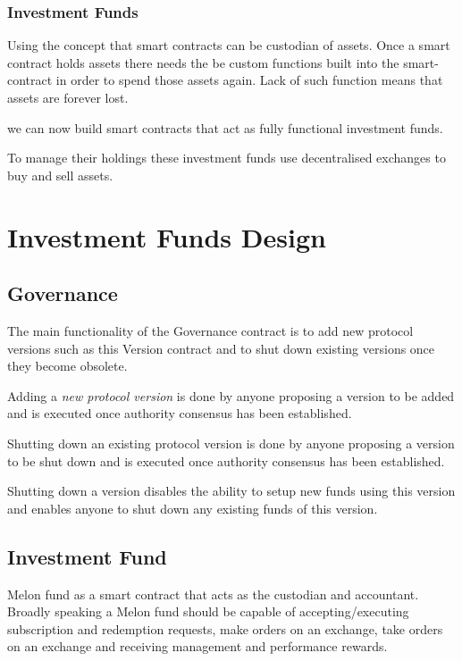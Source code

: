 \documentclass[conference]{IEEEtran}
\begin{document}
\subsubsection{Investment Funds}

Using the concept that smart contracts can be custodian of assets. Once a smart contract holds assets there needs the be custom functions built into the smart-contract in order to spend those assets again. Lack of such function means that assets are forever lost.

we can now build smart contracts that act as fully functional investment funds.

To manage their holdings these investment funds use decentralised exchanges to buy and sell assets.


\section{Investment Funds Design}

\subsection{Governance}

The main functionality of the Governance contract is to add new protocol versions such as this Version contract and to shut down existing versions once they become obsolete.

Adding a \textit{new protocol version} is done by anyone proposing a version to be added and is executed once authority consensus has been established.

Shutting down an existing protocol version is done by anyone proposing a version to be shut down and is executed once authority consensus has been established.

Shutting down a version disables the ability to setup new funds using this version and enables anyone to shut down any existing funds of this version.

\subsection{Investment Fund} \label{fund}

Melon fund as a smart contract that acts as the custodian and accountant. Broadly speaking a Melon fund should be capable of accepting/executing subscription and redemption requests, make orders on an exchange, take orders on an exchange and
receiving management and performance rewards.
\end{document}
